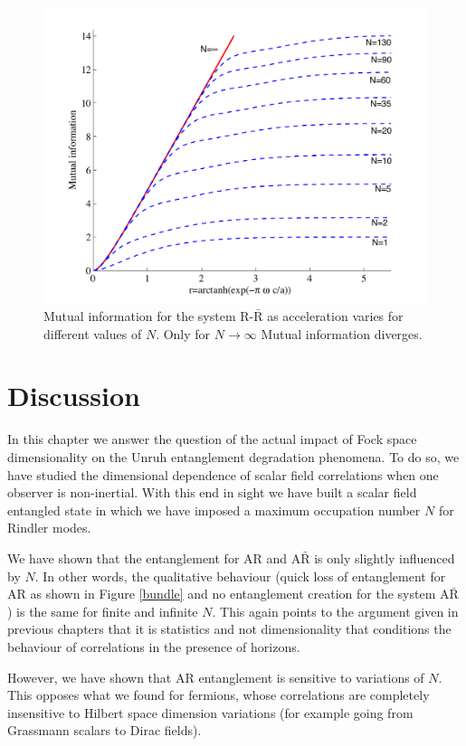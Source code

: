 \begin{figure}[H]
\begin{center}
\includegraphics[width=.85\textwidth]{MutualRAR}
\end{center}
\caption{Mutual information for the system R-${\bar{\text{R}}}$ as acceleration varies for different values of $N$. Only for $N\rightarrow\infty$ Mutual information diverges.}
\label{GOREBADA}
\end{figure}

\section{Discussion}\label{conclusions}

In this chapter we answer the question of the actual impact of Fock space dimensionality on the Unruh entanglement degradation phenomena. To do so, we have studied the dimensional dependence of scalar field correlations when one observer is non-inertial. With this end in sight we have built a scalar field entangled state in which we have imposed a maximum occupation number $N$ for Rindler modes.

We have shown that the entanglement for AR and $\text{A}{\bar{\text{R}}}$ is only slightly influenced by $N$. In other words, the qualitative behaviour (quick loss of entanglement for AR as shown in Figure \ref{bundle} and no entanglement creation for the system $\text{A}{\bar{\text{R}}}$) is the same for finite and infinite $N$. This again points to the argument given in previous chapters that it is statistics and not dimensionality that conditions the behaviour of correlations in the presence of horizons.

However, we have shown that AR entanglement is sensitive to variations of $N$. This opposes what we found for fermions, whose correlations are completely insensitive to Hilbert space dimension variations (for example going from Grassmann scalars to Dirac fields).

